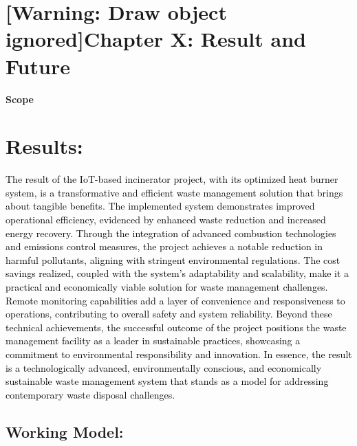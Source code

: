 \documentclass[letterpaper]{article}
\begin{document}
\clearpage\setcounter{page}{1}\pagestyle{Convertedxxi}
\section[Chapter X: Result and Future]{[Warning: Draw object ignored]Chapter X: Result and Future}
\textbf{Scope}


\bigskip


\bigskip

\section[Results:]{Results:}
\textcolor{black}{The result of the IoT-based incinerator project, with its optimized heat burner system, is a
transformative and efficient waste management solution that brings about tangible benefits. The implemented system
demonstrates improved operational efficiency, evidenced by enhanced waste reduction and increased energy recovery.
Through the integration of advanced combustion technologies and emissions control measures, the project achieves a
notable reduction in harmful pollutants, aligning with stringent environmental regulations. The cost savings realized,
coupled with the system's adaptability and scalability, make it a practical and economically viable solution for waste
management challenges. Remote monitoring capabilities add a layer of convenience and responsiveness to operations,
contributing to overall safety and system reliability. Beyond these technical achievements, the successful outcome of
the project positions the waste management facility as a leader in sustainable practices, showcasing a commitment to
environmental responsibility and innovation. In essence, the result is a technologically advanced, environmentally
conscious, and economically sustainable waste management system that stands as a model for addressing contemporary
waste disposal challenges.}


\bigskip


\bigskip

\subsection{Working Model:}

\bigskip


\bigskip


\bigskip


\bigskip


\bigskip


\bigskip
\end{document}
